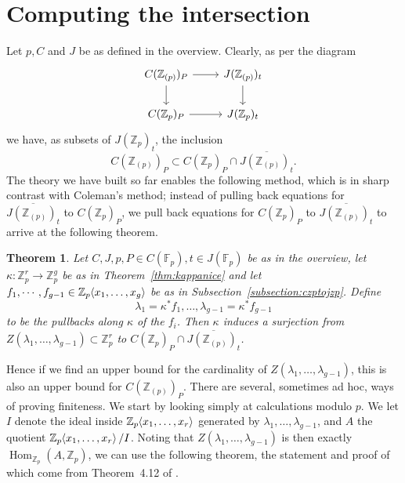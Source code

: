 \documentclass[12pt]{article}
\newcommand{\Z}{\mathbb{Z}}
\newcommand{\F}{\mathbb{F}}
\renewcommand{\angle}[1]{\hspace{-2pt}\left\langle #1 \right\rangle}
\DeclareMathOperator{\Hom}{Hom}
\theoremstyle{plain}
\newtheorem{thm}{Theorem}[section] %
\theoremstyle{definition}
\theoremstyle{remark}
\begin{document}
\section{Computing the intersection}
\label{section:intersection}
Let $p,C$ and $J$ be as defined in the overview. Clearly, as per the diagram \[
\begin{tikzcd}
C(\Z_{(p)})_P \arrow[d] \arrow[r] & J(\Z_{(p)})_t \arrow[d] \\
C(\Z_p)_P \arrow[r]              & J(\Z_p)_t        
\end{tikzcd}
\]
we have, as subsets of $J(\Z_p)_t$, the inclusion \[C(\Z_{(p)})_P \subset C(\Z_p)_P \cap \overline{J(\Z_{(p)})_t}.\]
The theory we have built so far enables the following method, which is in sharp contrast with Coleman's method; instead of pulling back equations for $\overline{J(\Z_{(p)})_t}$ to $C(\Z_p)_P$, we pull back equations for $C(\Z_p)_P$ to $\overline{J(\Z_{(p)})_t}$ to arrive at the following theorem.
\begin{thm}
\label{thm:final}
Let $C,J,p,P\in C(\F_p),t\in J(\F_p)$ be as in the overview, let $\kappa: \Z_p^r \to \Z_p^g$ be as in Theorem~\ref{thm:kappanice} and let $f_1,\cdots,f_{g-1} \in \Z_p\angle{x_1,\dots,x_g}$ be as in Subsection~\ref{subsection:czptojzp}. Define \[\lambda_1 = \kappa^*f_1,\dots,\lambda_{g-1} = \kappa^*f_{g-1}\] to be the pullbacks along $\kappa$ of the $f_i$. Then $\kappa$ induces a surjection from $Z(\lambda_1,\dots,\lambda_{g-1}) \subset \Z_p^r$ to $C(\Z_p)_P \cap \overline{J(\Z_{(p)})_t}$.
\end{thm}

Hence if we find an upper bound for the cardinality of $Z(\lambda_1,\dots,\lambda_{g-1})$, this is also an upper bound for $C(\Z_{(p)})_P$. There are several, sometimes ad hoc, ways of proving finiteness. We start by looking simply at calculations modulo $p$. We let $I$ denote the ideal inside $\Z_p\angle{x_1,\dots,x_r}$ generated by $\lambda_1,\dots,\lambda_{g-1}$, and $A$ the quotient $\Z_p\angle{x_1,\dots,x_r}/I$. Noting that $Z(\lambda_1,\dots,\lambda_{g-1})$ is then exactly $\Hom_{\Z_p}(A,\Z_p)$, we can use the following theorem, the statement and proof of which come from Theorem~4.12 of \cite{edixhoven20}.
\end{document}
